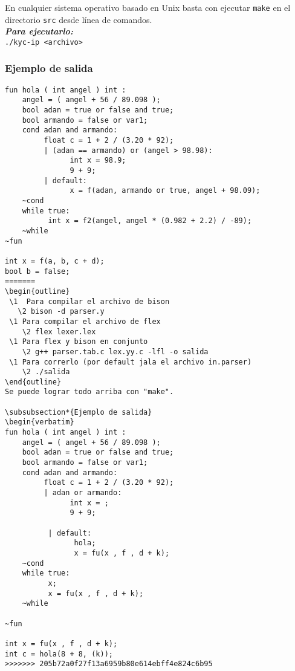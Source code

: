 \documentclass[12pt]{article}
\begin{document}
En cualquier sistema operativo basado en Unix basta con ejecutar \texttt{make} en el directorio \texttt{src} desde línea de comandos. \\

\textbf{\textit{Para ejecutarlo:}} \\

\texttt{./kyc-ip <archivo>}
\subsubsection*{Ejemplo de salida}
\begin{verbatim}
fun hola ( int angel ) int : 
    angel = ( angel + 56 / 89.098 );
    bool adan = true or false and true;
    bool armando = false or var1;
    cond adan and armando:
         float c = 1 + 2 / (3.20 * 92);
         | (adan == armando) or (angel > 98.98):
               int x = 98.9;
               9 + 9;
         | default:
               x = f(adan, armando or true, angel + 98.09);            
    ~cond
    while true:
          int x = f2(angel, angel * (0.982 + 2.2) / -89);            
    ~while
~fun

int x = f(a, b, c + d);
bool b = false;
=======
\begin{outline}
 \1  Para compilar el archivo de bison
   \2 bison -d parser.y
 \1 Para compilar el archivo de flex
    \2 flex lexer.lex
 \1 Para flex y bison en conjunto
    \2 g++ parser.tab.c lex.yy.c -lfl -o salida
 \1 Para correrlo (por default jala el archivo in.parser)
    \2 ./salida
\end{outline}
Se puede lograr todo arriba con "make".

\subsubsection*{Ejemplo de salida}
\begin{verbatim}
fun hola ( int angel ) int : 
    angel = ( angel + 56 / 89.098 );
    bool adan = true or false and true;
    bool armando = false or var1;
    cond adan and armando:
         float c = 1 + 2 / (3.20 * 92);
         | adan or armando:
               int x = ;
               9 + 9;

          | default:
                hola;
                x = fu(x , f , d + k);            
    ~cond
    while true:
          x;
          x = fu(x , f , d + k);            
    ~while
        
~fun

int x = fu(x , f , d + k);            
int c = hola(8 + 8, (k));
>>>>>>> 205b72a0f27f13a6959b80e614ebff4e824c6b95
\end{verbatim}
\end{document}
